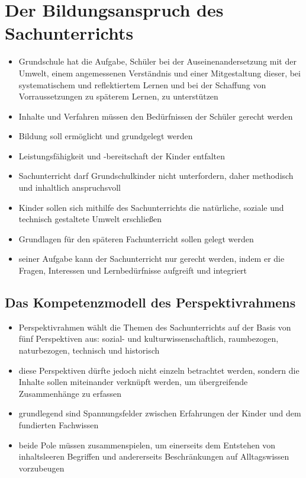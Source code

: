 {{\newpage

\section{Der Bildungsanspruch des Sachunterrichts} {\cite{GPS13}

\begin{itemize}

	\item{Grundschule hat die Aufgabe, Schüler bei der 		Auseinenandersetzung mit der Umwelt, einem angemessenen 	Verständnis und einer Mitgestaltung dieser, bei 		systematischem und reflektiertem Lernen und bei 	der Schaffung von Vorraussetzungen zu späterem Lernen, zu 		unterstützen}
	\item{Inhalte und Verfahren müssen den Bedürfnissen der Schüler gerecht werden}
	\item{Bildung soll ermöglicht und grundgelegt werden}
	\item{Leistungsfähigkeit und -bereitschaft der Kinder entfalten}
	\item{Sachunterricht darf Grundschulkinder nicht unterfordern, daher methodisch und inhaltlich anspruchsvoll}
	\item{Kinder sollen sich mithilfe des Sachunterrichts die natürliche, soziale und technisch gestaltete Umwelt erschließen}
	\item{Grundlagen für den späteren Fachunterricht sollen gelegt werden}
	\item{seiner Aufgabe kann der Sachunterricht nur gerecht werden, indem er die Fragen, Interessen und Lernbedürfnisse aufgreift und integriert}

\end{itemize}

\subsection{Das Kompetenzmodell des Perspektivrahmens}

\begin{itemize}

	\item{Perspektivrahmen wählt die Themen des Sachunterrichts auf der Basis von fünf Perspektiven aus: sozial- und kulturwissenschaftlich, raumbezogen, naturbezogen, technisch und historisch}
	\item{diese Perspektiven dürfte jedoch nicht einzeln betrachtet werden, sondern die Inhalte sollen miteinander verknüpft werden, um übergreifende Zusammenhänge zu erfassen}
	\item{grundlegend sind Spannungsfelder zwischen Erfahrungen der Kinder und dem fundierten Fachwissen}
	\item{beide Pole müssen zusammenspielen, um einerseits dem Entstehen von inhaltsleeren Begriffen und andererseits Beschränkungen auf Alltagswissen vorzubeugen}


\end{itemize}}}}
